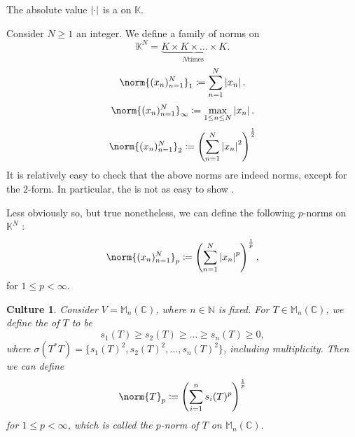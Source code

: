 \documentclass[notoc,notitlepage]{tufte-book}
\newtheorem*{culture}{\faWineGlass Culture}
\begin{document}
\begin{eg}
  The absolute value $\left|\cdot\right|$ is a  on $\mathbb{K}$.
\end{eg}

\begin{eg}[$p$-norms]\label{eg:p_norms}
  Consider $N \geq 1$ an integer. We define a family of norms on 
  \begin{equation*}
    \mathbb{K}^N = \underbrace{K \times K \times \hdots \times K}_{N \text{
    times }}.
  \end{equation*}
  \begin{equation*}
    \norm{(x_n)_{n=1}^{N}}_{1} \coloneqq \sum_{n=1}^{N} \abs{x_n}.
  \end{equation*}
  \begin{equation*}
    \norm{(x_n)_{n=1}^{N}}_{\infty} \coloneqq \max_{1 \leq n \leq N} \abs{x_n}.
  \end{equation*}
  \begin{equation*}
    \norm{(x_n)_{n=1}^{N}}_2 \coloneqq \left( \sum_{n=1}^{N} \abs{x_n}^2
    \right)^{\frac{1}{2}}
  \end{equation*}
  It is relatively easy to check that the above norms are indeed norms, except
  for the $2$-form. In particular, the  is not as
  easy to show .

  Less obviously so, but true nonetheless, we can define the following $p$-norms
  on $\mathbb{K}^N$ :
  \begin{equation*}
    \norm{(x_n)_{n=1}^N}_p \coloneqq \left( \sum_{n=1}^{N} \abs{x_n}^p
    \right)^{\frac{1}{p}},
  \end{equation*}
  for $1 \leq p < \infty$.
\end{eg}

\begin{culture}
  Consider $V = \mathbb{M}_n(\mathbb{C})$,  where $n \in \mathbb{N}$ is fixed.
  For $T \in \mathbb{M}_n(\mathbb{C})$, we define the 
  of $T$ to be
  \begin{equation*}
    s_1(T) \geq s_2(T) \geq \hdots \geq s_n(T) \geq 0,
  \end{equation*}
  where $\sigma(T^* T) = \{ s_1(T)^2, s_2(T)^2, \ldots, s_n(T)^2 \}$, including
  multiplicity. Then we can define
  \begin{equation*}
    \norm{T}_p \coloneqq \left( \sum_{i=1}^{n} s_i(T)^p \right)^{\frac{1}{p}}
  \end{equation*}
  for $1 \leq p < \infty$, which is called the $p$-norm of $T$ on
  $\mathbb{M}_n(\mathbb{C})$.
\end{culture}
\end{document}

